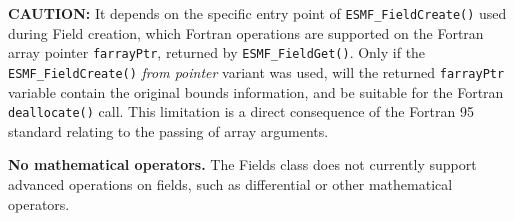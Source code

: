 

\begin{enumerate}
\label{Field:rest}

\begin{sloppypar}
\item {\bf CAUTION:} It depends on the specific entry point of {\tt ESMF\_FieldCreate()} used during Field creation, which Fortran operations are supported on the Fortran array pointer {\tt farrayPtr}, returned by {\tt ESMF\_FieldGet()}. Only if the {\tt ESMF\_FieldCreate()} {\em from pointer} variant was used, will the returned {\tt farrayPtr} variable contain the original bounds information, and be suitable for the Fortran {\tt deallocate()} call. This limitation is a direct consequence of the Fortran 95 standard relating to the passing of array arguments.
\end{sloppypar}

\item {\bf No mathematical operators.}  The Fields class does not 
currently support advanced
operations on fields, such as differential or other
mathematical operators.

\end{enumerate}
